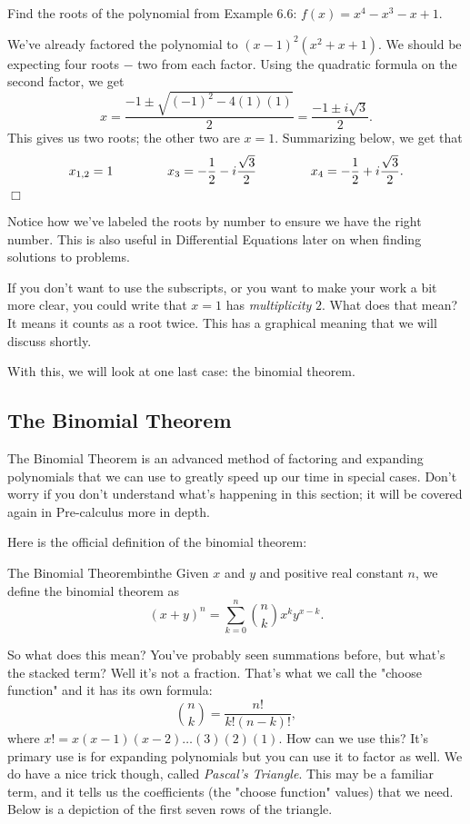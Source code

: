 \documentclass[lang=en,11pt]{elegantbook}
\begin{document}
\begin{example}
Find the roots of the polynomial from Example 6.6: $f(x)=x^4-x^3-x+1$.
\end{example}
\begin{solution}
We've already factored the polynomial to $(x-1)^2(x^2+x+1)$.  We should be expecting four roots $-$ two from each factor.  Using the quadratic formula on the second factor, we get $$x=\dfrac{-1\pm\sqrt{(-1)^2-4(1)(1)}}{2}=\dfrac{-1\pm i\sqrt{3}}{2}.$$ This gives us two roots; the other two are $x=1$. Summarizing below, we get that $$x_{1,2}=1 \hspace{15mm} x_3=-\dfrac{1}{2}-i\dfrac{\sqrt{3}}{2} \hspace{15mm} x_4=-\dfrac{1}{2}+i\dfrac{\sqrt{3}}{2}.$$ $\Box$
\end{solution}
\begin{remark}
Notice how we've labeled the roots by number to ensure we have the right number.  This is also useful in Differential Equations later on when finding solutions to problems.
\end{remark}
If you don't want to use the subscripts, or you want to make your work a bit more clear, you could write that $x=1$ has \textit{multiplicity} $2$. What does that mean? It means it counts as a root twice.  This has a graphical meaning that we will discuss shortly.

With this, we will look at one last case: the binomial theorem.
\subsection{The Binomial Theorem}
\noindent The Binomial Theorem is an advanced method of factoring and expanding polynomials that we can use to greatly speed up our time in special cases.  Don't worry if you don't understand what's happening in this section; it will be covered again in Pre-calculus more in depth.

Here is the official definition of the binomial theorem:
\begin{theorem}{The Binomial Theorem}{binthe}
Given $x$ and $y$ and positive real constant $n$, we define the binomial theorem as $$(x+y)^n=\sum_{k=0}^{n}{\binom{n}{k}x^ky^{x-k}}.$$
\end{theorem}
So what does this mean? You've probably seen summations before, but what's the stacked term? Well it's not a fraction.  That's what we call the "choose function" and it has its own formula: $$\binom{n}{k}=\dfrac{n!}{k!(n-k)!},$$ where $x!=x(x-1)(x-2)\ldots(3)(2)(1).$ How can we use this? It's primary use is for expanding polynomials but you can use it to factor as well.  We do have a nice trick though, called \textit{Pascal's Triangle}.  This may be a familiar term, and it tells us the coefficients (the "choose function" values) that we need.  Below is a depiction of the first seven rows of the triangle.
\end{document}
